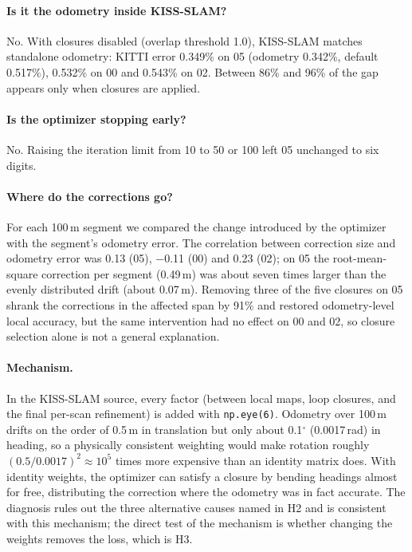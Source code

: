 \documentclass[11pt,a4paper]{article}
\begin{document}
\paragraph{Is it the odometry inside KISS-SLAM?} No. With closures disabled (overlap threshold 1.0), KISS-SLAM
matches standalone odometry: KITTI error 0.349\% on 05 (odometry 0.342\%, default 0.517\%), 0.532\% on 00 and
0.543\% on 02. Between 86\% and 96\% of the gap appears only when closures are applied.

\paragraph{Is the optimizer stopping early?} No. Raising the iteration limit from 10 to 50 or 100 left 05
unchanged to six digits.

\paragraph{Where do the corrections go?} For each 100\,m segment we compared the change introduced by the
optimizer with the segment's odometry error. The correlation between correction size and odometry error was
0.13 (05), $-$0.11 (00) and 0.23 (02); on 05 the root-mean-square correction per segment (0.49\,m) was about
seven times larger than the evenly distributed drift (about 0.07\,m). Removing three of the five closures on
05 shrank the corrections in the affected span by 91\% and restored odometry-level local accuracy, but the
same intervention had no effect on 00 and 02, so closure selection alone is not a general explanation.

\paragraph{Mechanism.} In the KISS-SLAM source, every factor (between local maps, loop closures, and the final
per-scan refinement) is added with \texttt{np.eye(6)}. Odometry over 100\,m drifts on the order of 0.5\,m in
translation but only about 0.1$^\circ$ (0.0017\,rad) in heading, so a physically consistent weighting would make
rotation roughly $(0.5/0.0017)^2 \approx 10^5$ times more expensive than an identity matrix does. With identity
weights, the optimizer can satisfy a closure by bending headings almost for free, distributing the correction
where the odometry was in fact accurate. The diagnosis rules out the three alternative causes named in H2 and is
consistent with this mechanism; the direct test of the mechanism is whether changing the weights removes the
loss, which is H3.
\end{document}
